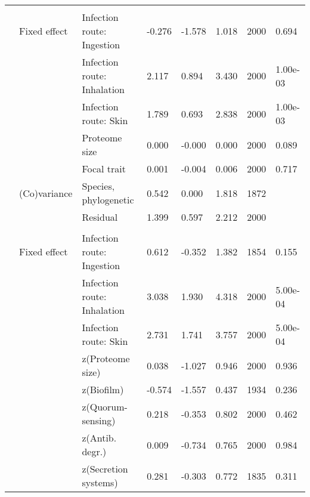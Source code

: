 \begin{table}
\begin{tabular}[t]{llllllll}
\addlinespace[0.3em]
\multicolumn{8}{l}{\textbf{Virulence factors}}\\
\hspace{1em} & Fixed effect & Infection route: Ingestion & -0.276 & -1.578 & 1.018 & 2000 & 0.694\\
\hspace{1em} &  & Infection route: Inhalation & 2.117 & 0.894 & 3.430 & 2000 & 1.00e-03\\
\hspace{1em} &  & Infection route: Skin & 1.789 & 0.693 & 2.838 & 2000 & 1.00e-03\\
\hspace{1em} &  & Proteome size & 0.000 & -0.000 & 0.000 & 2000 & 0.089\\
\hspace{1em} &  & Focal trait & 0.001 & -0.004 & 0.006 & 2000 & 0.717\\
\hspace{1em} & (Co)variance & Species, phylogenetic & 0.542 & 0.000 & 1.818 & 1872 & \\
\hspace{1em} &  & Residual & 1.399 & 0.597 & 2.212 & 2000 & \\
\addlinespace[0.3em]
\multicolumn{8}{l}{\textbf{Multivariate model}}\\
\hspace{1em} & Fixed effect & Infection route: Ingestion & 0.612 & -0.352 & 1.382 & 1854 & 0.155\\
\hspace{1em} &  & Infection route: Inhalation & 3.038 & 1.930 & 4.318 & 2000 & 5.00e-04\\
\hspace{1em} &  & Infection route: Skin & 2.731 & 1.741 & 3.757 & 2000 & 5.00e-04\\
\hspace{1em} &  & z(Proteome size) & 0.038 & -1.027 & 0.946 & 2000 & 0.936\\
\hspace{1em} &  & z(Biofilm) & -0.574 & -1.557 & 0.437 & 1934 & 0.236\\
\hspace{1em} &  & z(Quorum-sensing) & 0.218 & -0.353 & 0.802 & 2000 & 0.462\\
\hspace{1em} &  & z(Antib. degr.) & 0.009 & -0.734 & 0.765 & 2000 & 0.984\\
\hspace{1em} &  & z(Secretion systems) & 0.281 & -0.303 & 0.772 & 1835 & 0.311\\

\end{tabular}
\end{table}

